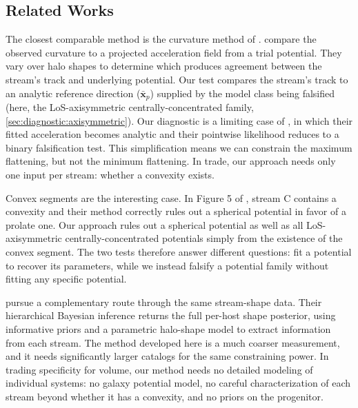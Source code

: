 \documentclass[linenumbers,twocolumn]{aastex701}
\renewcommand{\mbf}[1]{\boldsymbol{#1}}
\newcommand{\xvec}{\mbf{x}}  %
\newcommand{\xcom}{\proj{\bar{\xvec}}}  %
\newcommand{\proj}[1]{{#1}_{p}}  %
\begin{document}

    \subsection{Related Works}\label{sec:discussion:related_works}

        The closest comparable method is the curvature method of . %
         compare the observed curvature to a projected acceleration field from a trial potential. They vary over halo shapes to determine which produces agreement between the stream's track and underlying potential. %
        Our test compares the stream's track to an analytic reference direction ($\xcom$) supplied by the model class being falsified (here, the \gls{LoS}-axisymmetric centrally-concentrated family, \autoref{sec:diagnostic:axisymmetric}). %
        Our diagnostic is a limiting case of , in which their fitted acceleration becomes analytic and their pointwise likelihood reduces to a binary falsification test. %
        This simplification means we can constrain the maximum flattening, but not the minimum flattening. %
        In trade, our approach needs only one input per stream: whether a convexity exists. %

        Convex segments are the interesting case. %
        In Figure 5 of , stream C contains a convexity and their method correctly rules out a spherical potential in favor of a prolate one. %
        Our approach rules out a spherical potential as well as all \gls{LoS}-axisymmetric centrally-concentrated potentials simply from the existence of the convex segment. %
        The two tests therefore answer different questions:  fit a potential to recover its parameters, while we instead falsify a potential family without fitting any specific potential. %

        \citet{Chemaly+:2026:HierarchicalBayesianInference} pursue a complementary route through the same stream-shape data. %
        Their hierarchical Bayesian inference returns the full per-host shape posterior, using informative priors and a parametric halo-shape model to extract information from each stream. %
        The method developed here is a much coarser measurement, and it needs significantly larger catalogs for the same constraining power. %
        In trading specificity for volume, our method needs no detailed modeling of individual systems: no galaxy potential model, no careful characterization of each stream beyond whether it has a convexity, and no priors on the progenitor. %
\end{document}
